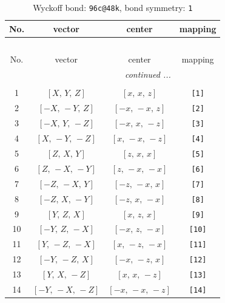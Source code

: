 \documentclass[fleqn,8pt]{jsarticle}
\begin{document}
\begin{longtable}{cccc}
\caption{Wyckoff bond: {\tt 96c@48k}, bond symmetry: {\tt 1}}
 \\
 \hline \hline
No. & vector & center & mapping \\ \hline \endfirsthead

\multicolumn{3}{l}{\tablename\ \thetable{}} \\
 \hline \hline
No. & vector & center & mapping \\ \hline \endhead

 \hline \hline
\multicolumn{3}{r}{\footnotesize\it continued ...} \\ \endfoot

 \hline \hline
\multicolumn{3}{r}{} \\ \endlastfoot

1 & $\left[ X,\, Y,\, Z \right]$ & $\left[ x,\, x,\, z \right]$ & {\tt [1]} \\ \hline
2 & $\left[ - X,\, - Y,\, Z \right]$ & $\left[ - x,\, - x,\, z \right]$ & {\tt [2]} \\ \hline
3 & $\left[ - X,\, Y,\, - Z \right]$ & $\left[ - x,\, x,\, - z \right]$ & {\tt [3]} \\ \hline
4 & $\left[ X,\, - Y,\, - Z \right]$ & $\left[ x,\, - x,\, - z \right]$ & {\tt [4]} \\ \hline
5 & $\left[ Z,\, X,\, Y \right]$ & $\left[ z,\, x,\, x \right]$ & {\tt [5]} \\ \hline
6 & $\left[ Z,\, - X,\, - Y \right]$ & $\left[ z,\, - x,\, - x \right]$ & {\tt [6]} \\ \hline
7 & $\left[ - Z,\, - X,\, Y \right]$ & $\left[ - z,\, - x,\, x \right]$ & {\tt [7]} \\ \hline
8 & $\left[ - Z,\, X,\, - Y \right]$ & $\left[ - z,\, x,\, - x \right]$ & {\tt [8]} \\ \hline
9 & $\left[ Y,\, Z,\, X \right]$ & $\left[ x,\, z,\, x \right]$ & {\tt [9]} \\ \hline
10 & $\left[ - Y,\, Z,\, - X \right]$ & $\left[ - x,\, z,\, - x \right]$ & {\tt [10]} \\ \hline
11 & $\left[ Y,\, - Z,\, - X \right]$ & $\left[ x,\, - z,\, - x \right]$ & {\tt [11]} \\ \hline
12 & $\left[ - Y,\, - Z,\, X \right]$ & $\left[ - x,\, - z,\, x \right]$ & {\tt [12]} \\ \hline
13 & $\left[ Y,\, X,\, - Z \right]$ & $\left[ x,\, x,\, - z \right]$ & {\tt [13]} \\ \hline
14 & $\left[ - Y,\, - X,\, - Z \right]$ & $\left[ - x,\, - x,\, - z \right]$ & {\tt [14]} \\ \hline

\end{longtable}
\end{document}
